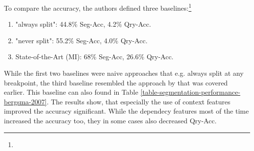 To compare the accuracy, the authors defined three baselines:\footnote{}
\begin{enumerate}
\item[1)] "always split": 44.8\% Seg-Acc, 4.2\% Qry-Acc.
\item[2)] "never split": 55.2\% Seg-Acc, 4.0\% Qry-Acc.
\item[3)] State-of-the-Art (MI): 68\% Seg-Acc, 26.6\% Qry-Acc.
\end{enumerate}
While the first two baselines were naive approaches that e.g. always split at any breakpoint, the third baseline resembled the approach by \citeauthor{Risvik:2003} that was covered earlier. This baseline can also found in Table \ref{table-segmentation-performance-bergsma-2007}. The results show, that especially the use of context features improved the accuracy significant. While the dependecy features most of the time increased the accuracy too, they in some cases also decreased Qry-Acc.